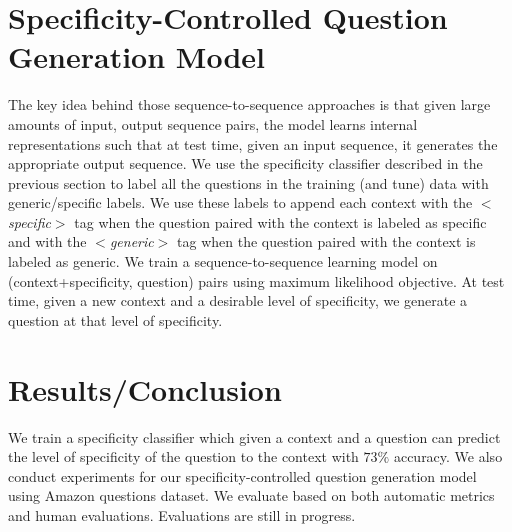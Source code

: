 \documentclass[11pt]{article}
\begin{document}

\section{Specificity-Controlled Question Generation Model}\label{model}
The key idea behind those sequence-to-sequence approaches is that given large amounts of input, output sequence pairs, the model learns internal representations such that at test time, given an input sequence, it generates the appropriate output sequence. 
We use the specificity classifier described in the previous section to label all the questions in the training (and tune) data with generic/specific labels. 
We use these labels to append each context with the \textit{$<$specific$>$} tag when the question paired with the context is labeled as specific and with the \textit{$<$generic$>$} tag when the question paired with the context is labeled as generic.
We train a sequence-to-sequence learning model \cite{sutskever2014sequence} on (context+specificity, question) pairs using maximum likelihood objective. 
At test time, given a new context and a desirable level of specificity, we generate a question at that level of specificity.


\section{Results/Conclusion}
We train a specificity classifier which given a context and a question can predict the level of specificity of the question to the context with $73 \%$ accuracy. 
We also conduct experiments for our specificity-controlled question generation model using Amazon questions dataset. We evaluate based on both automatic metrics and human evaluations. Evaluations are still in progress.

%
%



\end{document}
